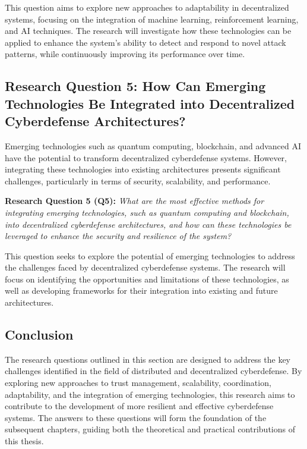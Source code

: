 This question aims to explore new approaches to adaptability in decentralized systems, focusing on the integration of machine learning, reinforcement learning, and AI techniques. The research will investigate how these technologies can be applied to enhance the system's ability to detect and respond to novel attack patterns, while continuously improving its performance over time.

\subsection{Research Question 5: How Can Emerging Technologies Be Integrated into Decentralized Cyberdefense Architectures?}

Emerging technologies such as quantum computing, blockchain, and advanced AI have the potential to transform decentralized cyberdefense systems. However, integrating these technologies into existing architectures presents significant challenges, particularly in terms of security, scalability, and performance.

\textbf{Research Question 5 (Q5):} \textit{What are the most effective methods for integrating emerging technologies, such as quantum computing and blockchain, into decentralized cyberdefense architectures, and how can these technologies be leveraged to enhance the security and resilience of the system?}

This question seeks to explore the potential of emerging technologies to address the challenges faced by decentralized cyberdefense systems. The research will focus on identifying the opportunities and limitations of these technologies, as well as developing frameworks for their integration into existing and future architectures.

\subsection{Conclusion}

The research questions outlined in this section are designed to address the key challenges identified in the field of distributed and decentralized cyberdefense. By exploring new approaches to trust management, scalability, coordination, adaptability, and the integration of emerging technologies, this research aims to contribute to the development of more resilient and effective cyberdefense systems. The answers to these questions will form the foundation of the subsequent chapters, guiding both the theoretical and practical contributions of this thesis.



